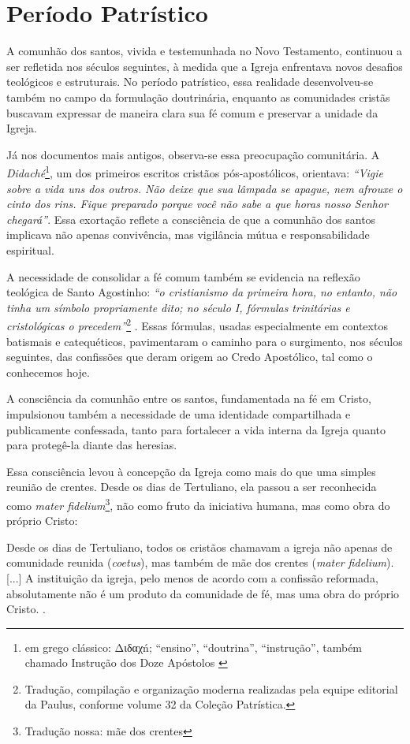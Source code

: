 \section{Período Patrístico}

A comunhão dos santos, vivida e testemunhada no Novo Testamento, continuou a ser refletida nos séculos seguintes, à medida que a Igreja enfrentava novos desafios teológicos e estruturais. No período patrístico, essa realidade desenvolveu-se também no campo da formulação doutrinária, enquanto as comunidades cristãs buscavam expressar de maneira clara sua fé comum e preservar a unidade da Igreja.

Já nos documentos mais antigos, observa-se essa preocupação comunitária. A \textit{Didaché}\footnote{em grego clássico: \foreignlanguage{greek}{Διδαχń}; ``ensino'', ``doutrina'', ``instrução'', também chamado Instrução dos Doze Apóstolos \cite{wikididaque}}, um dos primeiros escritos cristãos pós-apostólicos, orientava: \textit{``Vigie sobre a vida uns dos outros. Não deixe que sua lâmpada se apague, nem afrouxe o cinto dos rins. Fique preparado porque você não sabe a que horas nosso Senhor chegará''}\cite{didachePaulus2013}. Essa exortação reflete a consciência de que a comunhão dos santos implicava não apenas convivência, mas vigilância mútua e responsabilidade espiritual.

A necessidade de consolidar a fé comum também se evidencia na reflexão teológica de Santo Agostinho: \textit{``o cristianismo da primeira hora, no entanto, não tinha um símbolo propriamente dito; no século I, fórmulas trinitárias e cristológicas o precedem''}\footnote{Tradução, compilação e organização moderna realizadas pela equipe editorial da Paulus, conforme volume 32 da Coleção Patrística.} \cite[p.~8]{santos2013}. Essas fórmulas, usadas especialmente em contextos batismais e catequéticos, pavimentaram o caminho para o surgimento, nos séculos seguintes, das confissões que deram origem ao Credo Apostólico, tal como o conhecemos hoje.

A consciência da comunhão entre os santos, fundamentada na fé em Cristo, impulsionou também a necessidade de uma identidade compartilhada e publicamente confessada, tanto para fortalecer a vida interna da Igreja quanto para protegê-la diante das heresias.

Essa consciência levou à concepção da Igreja como mais do que uma simples reunião de crentes. Desde os dias de Tertuliano, ela passou a ser reconhecida como \textit{mater fidelium}\footnote{Tradução nossa: mãe dos crentes}, não como fruto da iniciativa humana, mas como obra do próprio Cristo:
\begin{citacao}
Desde os dias de Tertuliano, todos os cristãos chamavam a igreja não apenas de comunidade reunida (\textit{coetus}), mas também de mãe dos crentes (\textit{mater fidelium}). [...] A instituição da igreja, pelo menos de acordo com a confissão reformada, absolutamente não é um produto da comunidade de fé, mas uma obra do próprio Cristo. \cite[p.~335]{bavinck2012}.
\end{citacao}

